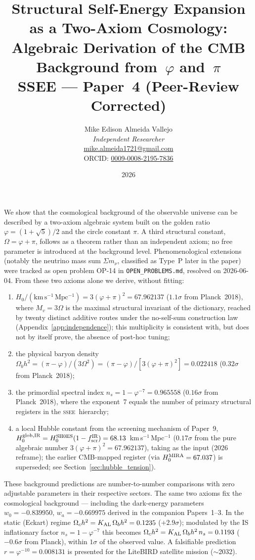 \documentclass[12pt,a4paper]{article}
\title{\textbf{Structural Self-Energy Expansion as a Two-Axiom Cosmology:\\
Algebraic Derivation of the CMB Background from~$\varphi$ and~$\pi$}\\[0.5em]
\normalsize SSEE — Paper~4 (Peer-Review Corrected)}
\author{Mike Edison Almeida Vallejo \\
\small \textit{Independent Researcher} \\
\small \href{mailto:mike.almeida1721@gmail.com}{mike.almeida1721@gmail.com} \\
\small ORCID: \href{https://orcid.org/0009-0008-2195-7836}{0009-0008-2195-7836}
}
\date{2026}
\newcommand{\SSEE}{\ifmmode\mathrm{SSEE}\else\textsc{ssee}\fi}
\renewenvironment{abstract}
  {\begin{center}\textbf{\abstractname}\end{center}\par\small\noindent\ignorespaces}
  {\par\medskip}
\begin{document}
\maketitle

\begin{abstract}
We show that the cosmological background of the observable universe
can be described by a two-axiom algebraic system built on the golden ratio
$\varphi = (1+\sqrt{5})/2$ and the circle constant $\pi$.
A third structural constant, $\Omega = \varphi+\pi$, follows as
a theorem rather than an independent axiom; no free parameter is introduced at the background level.
Phenomenological extensions (notably the neutrino mass sum $\Sigma m_\nu$, classified as Type~P later in the paper) were tracked as open problem OP-14 in \texttt{OPEN\_PROBLEMS.md}, resolved on 2026-06-04.
From these two axioms alone we derive, without fitting:
\begin{enumerate}
\item[(i)] $H_0/(\mathrm{km\,s^{-1}\,Mpc^{-1}}) = 3(\varphi+\pi)^2 = 67.962137$ ($1.1\sigma$ from Planck~2018),
where $M_v=3\Omega$ is the maximal structural invariant of the dictionary, reached by twenty distinct additive routes under the no-self-sum construction law (Appendix~\ref{app:independence}); this multiplicity is consistent with, but does not by itself prove, the absence of post-hoc tuning;
\item[(ii)] the physical baryon density
$\Omega_b h^2 = (\pi-\varphi)/(3\Omega^2) = (\pi-\varphi)/[3(\varphi+\pi)^2] = 0.022418$ ($0.32\sigma$ from Planck~2018);
\item[(iii)] the primordial spectral index
$n_s = 1-\varphi^{-7} = 0.965558$ ($0.16\sigma$ from Planck~2018),
where the exponent~7 equals the number of primary structural registers in the \SSEE\ hierarchy;
\item[(iv)] a local Hubble constant from the screening mechanism of Paper~9,
$H_0^{\rm glob,IR} = H_0^{\rm SH0ES}(1-f_{\rm scr}^{\rm IR}) = 68.13$~km\,s$^{-1}$\,Mpc$^{-1}$
($0.17\sigma$ from the pure algebraic number $3(\varphi+\pi)^2=67.962137$),
taking \citet{Riess2022} as the input (2026 reframe); the earlier
CMB-mapped register (via $H_0^{\rm MIRA}=67.037$) is superseded;
see Section~\ref{sec:hubble_tension}).
\end{enumerate}
These background predictions are number-to-number comparisons with zero adjustable parameters in their respective sectors.
The same two axioms fix the cosmological background --- including the
dark-energy parameters $w_0=-0.839950$, $w_a=-0.669975$ derived in the
companion Papers~1--3.
In the static (Eckart) regime $\Omega_c h^2 = K_{\rm AL}\,\Omega_b h^2 = 0.1235$ ($+2.9\sigma$);
modulated by the IS inflationary factor $n_s = 1-\varphi^{-7}$ this becomes
$\Omega_c h^2 = K_{\rm AL}\,\Omega_b h^2\,n_s = 0.1193$ ($-0.6\sigma$ from Planck),
within $1\sigma$ of the observed value.
A falsifiable prediction $r = \varphi^{-10} = 0.008131$ is presented for the
LiteBIRD satellite mission ($\sim$2032).
\end{abstract}
\end{document}
